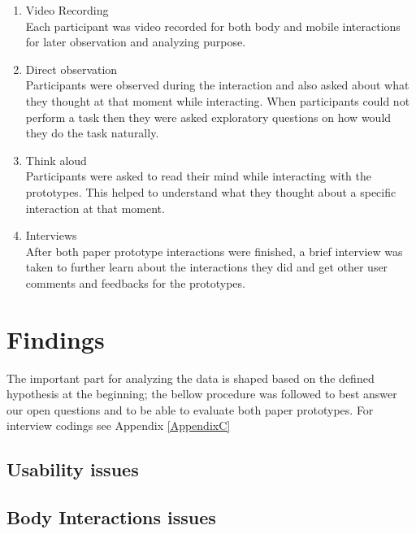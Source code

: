 \begin{enumerate}
\item Video Recording \\
Each participant was video recorded for both body and mobile interactions for later observation and analyzing purpose. 

\item Direct observation \\
Participants were observed during the interaction and also asked about what they thought at that moment while interacting. When participants could not perform a task then they were asked exploratory questions on how would they do the task naturally.

\item Think aloud \\
Participants were asked to read their mind while interacting with the prototypes. This helped to understand what they thought about a specific interaction at that moment. 

\item Interviews \\
After both paper prototype interactions were finished, a brief interview was taken to further learn about the interactions they did and get other user comments and feedbacks for the prototypes.
\end{enumerate}



\section{Findings}
The important part for analyzing the data is shaped based on the defined hypothesis at the beginning; the bellow procedure was followed to best answer our open questions and to be able to evaluate both paper prototypes. For interview codings see Appendix \ref{AppendixC}


\subsection{Usability issues}


\subsection{Body Interactions issues}


